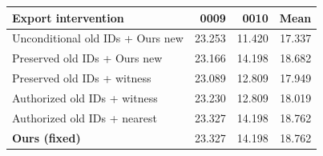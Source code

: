\begin{tabular}{@{}lrrr@{}}
\toprule
Export intervention & 0009 & 0010 & Mean \\
\midrule
Unconditional old IDs + Ours new & 23.253 & 11.420 & 17.337 \\
Preserved old IDs + Ours new & 23.166 & 14.198 & 18.682 \\
Preserved old IDs + witness & 23.089 & 12.809 & 17.949 \\
Authorized old IDs + witness & 23.230 & 12.809 & 18.019 \\
Authorized old IDs + nearest & 23.327 & 14.198 & 18.762 \\
\textbf{Ours (fixed)} & 23.327 & 14.198 & 18.762 \\
\bottomrule
\end{tabular}
